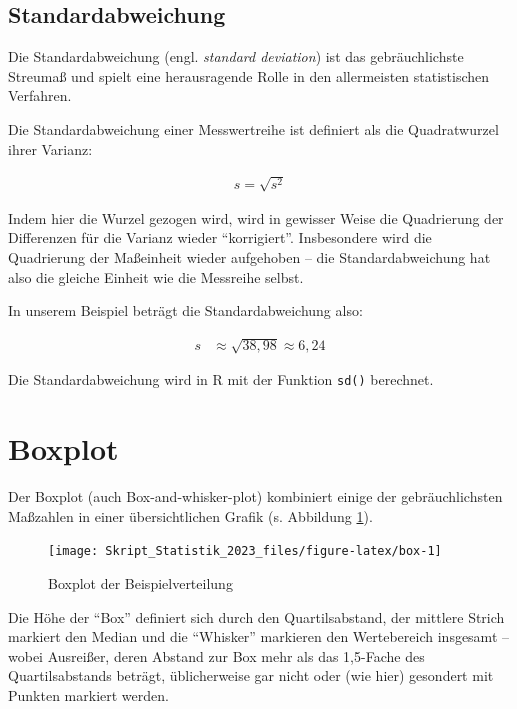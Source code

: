 \documentclass[
  11pt,
  ngerman,
  a4paper,
]{report}
\newenvironment{rtip}{
  \medskip
  \begin{tcolorbox}[colframe=purple,colback=light_gray,title=Softwarehinweis]
}{
  \end{tcolorbox}
  \medskip
}
\begin{document}
\hypertarget{standardabweichung}{%
\subsection{Standardabweichung}\label{standardabweichung}}

Die Standardabweichung (engl. \emph{standard deviation}) ist das gebräuchlichste Streumaß und spielt eine herausragende Rolle in den allermeisten statistischen Verfahren.

Die Standardabweichung einer Messwertreihe ist definiert als die Quadratwurzel ihrer Varianz:

\[
  \begin{aligned}
    s=\sqrt{s^2}
  \end{aligned}
  \label{eq:sd}
\]

Indem hier die Wurzel gezogen wird, wird in gewisser Weise die Quadrierung der Differenzen für die Varianz wieder \enquote{korrigiert}. Insbesondere wird die Quadrierung der Maßeinheit wieder aufgehoben -- die Standardabweichung hat also die gleiche Einheit wie die Messreihe selbst.

In unserem Beispiel beträgt die Standardabweichung also:

\[
  \begin{aligned}
    s&\approx\sqrt{38{,}98}
      \approx6{,}24
  \end{aligned}
\]

\begin{rtip}
Die Standardabweichung wird in R mit der Funktion \verb|sd()| berechnet.
\end{rtip}

\hypertarget{boxplot}{%
\section{Boxplot}\label{boxplot}}

Der Boxplot (auch Box-and-whisker-plot) kombiniert einige der gebräuchlichsten Maßzahlen in einer übersichtlichen Grafik (s. Abbildung \ref{fig:box}).

\begin{figure}[!h]

{\centering \texttt{[image: Skript\_Statistik\_2023\_files/figure-latex/box-1]} 

}

\caption{Boxplot der Beispielverteilung}\label{fig:box}
\end{figure}

Die Höhe der \enquote{Box} definiert sich durch den Quartilsabstand, der mittlere Strich markiert den Median und die \enquote{Whisker} markieren den Wertebereich insgesamt -- wobei Ausreißer, deren Abstand zur Box mehr als das 1,5-Fache des Quartilsabstands beträgt, üblicherweise gar nicht oder (wie hier) gesondert mit Punkten markiert werden.
\end{document}
